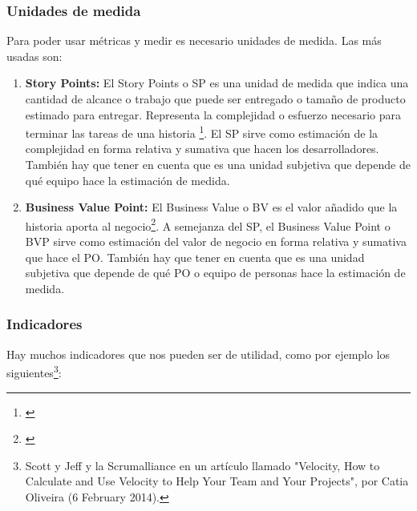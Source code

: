 \subsubsection{Unidades de medida}

Para poder usar métricas y medir es necesario unidades de medida. Las más usadas son:

\begin{enumerate}

\item {\textbf{Story Points:}
El Story Points o SP es una unidad de medida que indica una cantidad de alcance o trabajo que puede ser entregado o tamaño de producto estimado para entregar. Representa la complejidad o esfuerzo necesario para terminar las tareas de una historia \footnote{\cite{Jipson-Thomas-2015}}. El SP sirve como estimación de la complejidad en forma relativa y sumativa que hacen los desarrolladores. También hay que tener en cuenta que es una unidad subjetiva que depende de qué equipo hace la estimación de medida.
}

\item {\textbf{Business Value Point:}
El Business Value o BV es el valor añadido que la historia aporta al negocio\footnote{\cite{Pointet-Botton-2012}}. A semejanza del SP, el Business Value Point o BVP sirve como estimación del valor de negocio en forma relativa y sumativa que hace el PO. También hay que tener en cuenta que es una unidad subjetiva que depende de qué PO o equipo de personas hace la estimación de medida.
}

\end{enumerate}

\subsubsection{Indicadores}

Hay muchos indicadores que nos pueden ser de utilidad, como por ejemplo los siguientes\footnote{Scott y Jeff \cite{Scott-Jeff-2013} y la  Scrumalliance en un artículo llamado "Velocity, How to Calculate and Use Velocity to Help Your Team and Your Projects", por Catia Oliveira (6 February 2014).}:

